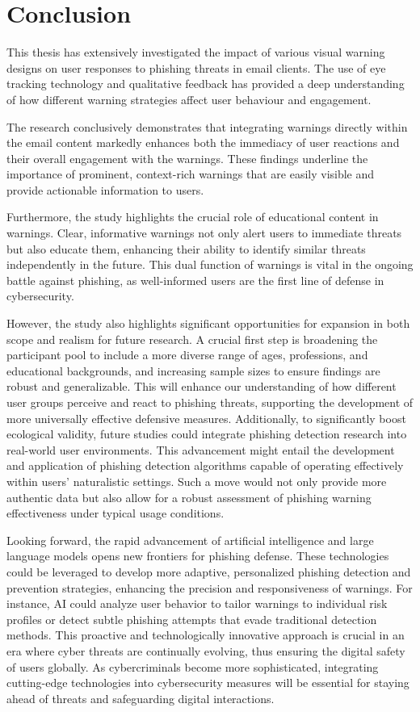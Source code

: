 \documentclass[
  a4paper,  %
  twoside,  %
  bibliography=totoc,
  headsepline,
  cleardoublepage=empty,
  parskip=half,
  draft=false
]{scrbook}
\begin{document}
\chapter{Conclusion}
\label{sec:conclusion}
This thesis has extensively investigated the impact of various visual warning designs on user responses to phishing threats in email clients. The use of eye tracking technology and qualitative feedback has provided a deep understanding of how different warning strategies affect user behaviour and engagement.

The research conclusively demonstrates that integrating warnings directly within the email content markedly enhances both the immediacy of user reactions and their overall engagement with the warnings. These findings underline the importance of prominent, context-rich warnings that are easily visible and provide actionable information to users.

Furthermore, the study highlights the crucial role of educational content in warnings. Clear, informative warnings not only alert users to immediate threats but also educate them, enhancing their ability to identify similar threats independently in the future. This dual function of warnings is vital in the ongoing battle against phishing, as well-informed users are the first line of defense in cybersecurity.

However, the study also highlights significant opportunities for expansion in both scope and realism for future research. A crucial first step is broadening the participant pool to include a more diverse range of ages, professions, and educational backgrounds, and increasing sample sizes to ensure findings are robust and generalizable. This will enhance our understanding of how different user groups perceive and react to phishing threats, supporting the development of more universally effective defensive measures. Additionally, to significantly boost ecological validity, future studies could integrate phishing detection research into real-world user environments. This advancement might entail the development and application of phishing detection algorithms capable of operating effectively within users' naturalistic settings. Such a move would not only provide more authentic data but also allow for a robust assessment of phishing warning effectiveness under typical usage conditions.

Looking forward, the rapid advancement of artificial intelligence and large language models opens new frontiers for phishing defense. These technologies could be leveraged to develop more adaptive, personalized phishing detection and prevention strategies, enhancing the precision and responsiveness of warnings. For instance, AI could analyze user behavior to tailor warnings to individual risk profiles or detect subtle phishing attempts that evade traditional detection methods. This proactive and technologically innovative approach is crucial in an era where cyber threats are continually evolving, thus ensuring the digital safety of users globally. As cybercriminals become more sophisticated, integrating cutting-edge technologies into cybersecurity measures will be essential for staying ahead of threats and safeguarding digital interactions.
\end{document}
